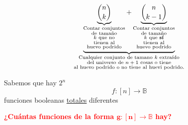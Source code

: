 \documentclass[../main.tex]{subfiles}
\begin{document}
{\Huge
	\[
		\underbrace
		{
			\underbrace{\binom{n}{k}}_
			{\substack{\text{Contar conjuntos}\\
					\text{de tamaño}\\
					\text{$k$ que no}\\
					\text{tienen al}\\
			\text{huevo podrido} }}
			+\underbrace{\binom{n}{k-1}}_
			{\substack{\text{Contar conjuntos}\\
					\text{de tamaño}\\
					\text{$k$ que \textbf{sí}}\\
					\text{tienen al}\\
			\text{huevo podrido} }}
		}_
		{\substack{\text{Cualquier conjunto de tamano $k$ extraído}\\
				\text{del universo de $n+1$ cosas o tiene}\\
		\text{al huevo podrido o no tiene al huevi podrido.} }}
	\]
}

Sabemos que hay $2^n$
\[
	f:[n]\longrightarrow\mathbb{B}
\]
funciones booleanas \underline{totales} diferentes

\textcolor{red}{ \textbf{¿Cuántas funciones de la forma $\mathbf{g:[n]
\longrightarrow\mathbb{B}}$ hay?}}
\end{document}
